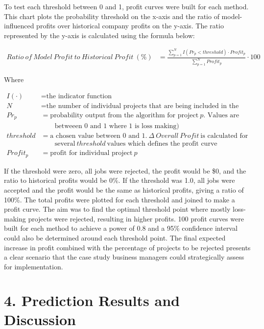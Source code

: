 \documentclass[]{elsarticle} %
\begin{document}
To test each threshold between 0 and 1, profit curves were built for
each method. This chart plots the probability threshold on the x-axis
and the ratio of model-influenced profits over historical company
profits on the y-axis. The ratio represented by the y-axis is calculated
using the formula below:

\[
\begin{aligned}
Ratio\ of\ Model\ Profit\ to\ Historical\ Profit\ (\%) &= \frac{\sum_{p = 1}^{N} I(Pr_p < threshold) \cdot Profit_p}{\sum_{p = 1}^{N} Profit_p} \cdot100
\end{aligned}
\]

Where

\[
\begin{aligned}
I(\cdot) &= \textrm{the indicator function} \\
N\ &= \textrm{the number of individual projects that are being included in the analysis} \\
Pr_{p} &= \textrm{probability output from the algorithm for project}\ p \textrm{. Values are}\\
& \qquad \textrm{betweeen 0 and 1 where 1 is loss making)} \\
threshold &= \textrm{a chosen value between 0 and 1.}\ \Delta\ Overall\ Profit\ \textrm{is calculated for} \\
& \qquad \textrm{several}\ threshold\ \textrm{values which defines the profit curve} \\
Profit_p &= \textrm{profit for individual project}\ p
\end{aligned}
\]

If the threshold were zero, all jobs were rejected, the profit would be
\$0, and the ratio to historical profits would be 0\%. If the threshold
was 1.0, all jobs were accepted and the profit would be the same as
historical profits, giving a ratio of 100\%. The total profits were
plotted for each threshold and joined to make a profit curve. The aim
was to find the optimal threshold point where mostly loss-making
projects were rejected, resulting in higher profits. 100 profit curves
were built for each method to achieve a power of 0.8 and a 95\%
confidence interval could also be determined around each threshold
point. The final expected increase in profit combined with the
percentage of projects to be rejected presents a clear scenario that the
case study business managers could strategically assess for
implementation.

\section{4. Prediction Results and
Discussion}\label{prediction-results-and-discussion}
\end{document}
